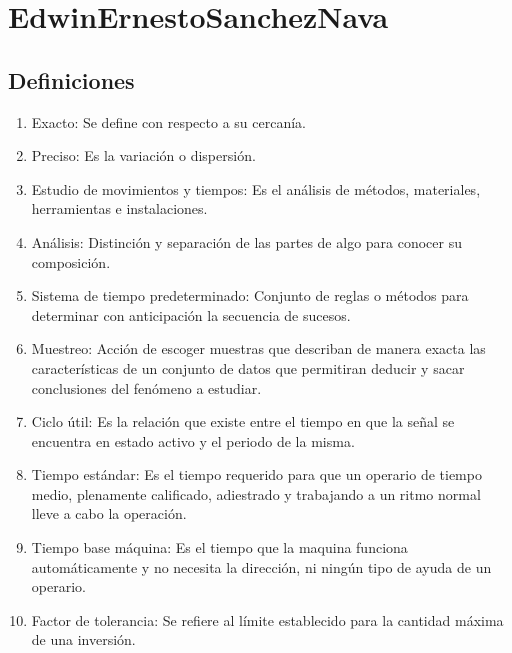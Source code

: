 \section{EdwinErnestoSanchezNava}
\subsection{Definiciones}

\begin{enumerate}
    \item Exacto: Se define con respecto a su cercanía.
    \item Preciso: Es la variación o dispersión.
    \item Estudio de movimientos y tiempos: Es el análisis de métodos, materiales, herramientas e instalaciones.
    \item Análisis: Distinción y separación de las partes de algo para conocer su composición.
    \item Sistema de tiempo predeterminado: Conjunto de reglas o métodos para determinar con anticipación la secuencia de sucesos.
    \item Muestreo: Acción de escoger muestras que describan de manera exacta las características de un conjunto de datos que permitiran deducir y sacar conclusiones del fenómeno a estudiar.
    \item Ciclo útil: Es la relación que existe entre el tiempo en que la señal se encuentra en estado activo y el periodo de la misma.
    \item Tiempo estándar: Es el tiempo requerido para que un operario de tiempo medio, plenamente calificado, adiestrado y trabajando a un ritmo normal lleve a cabo la operación.
    \item Tiempo base máquina: Es el tiempo que la maquina funciona automáticamente y no necesita la dirección, ni ningún tipo de ayuda de un operario.
    \item Factor de tolerancia: Se refiere al límite establecido para la cantidad máxima de una inversión.
    
\end{enumerate}